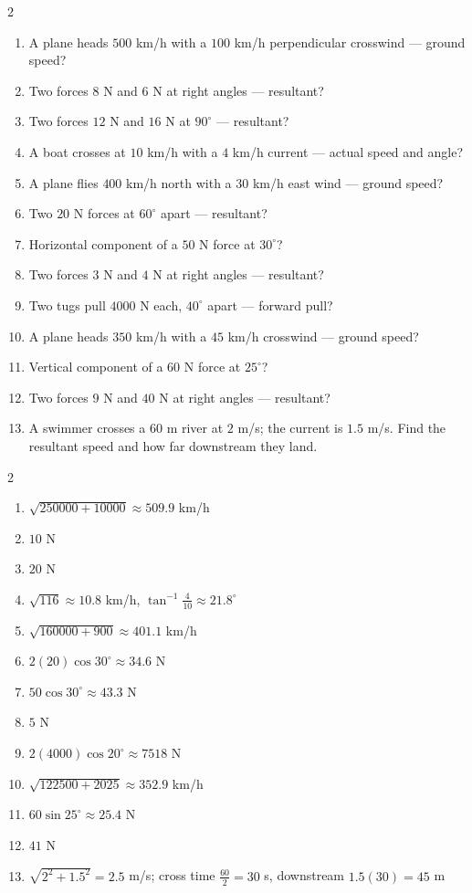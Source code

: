 \documentclass[11pt]{article}
\begin{document}
\begin{recapbox}
\begin{multicols}{2}
\small
\begin{enumerate}[leftmargin=*,itemsep=3pt]
  \item A plane heads $500$ km/h with a $100$ km/h perpendicular crosswind — ground speed?
  \item Two forces $8$ N and $6$ N at right angles — resultant?
  \item Two forces $12$ N and $16$ N at $90^\circ$ — resultant?
  \item A boat crosses at $10$ km/h with a $4$ km/h current — actual speed and angle?
  \item A plane flies $400$ km/h north with a $30$ km/h east wind — ground speed?
  \item Two $20$ N forces at $60^\circ$ apart — resultant?
  \item Horizontal component of a $50$ N force at $30^\circ$?
  \item Two forces $3$ N and $4$ N at right angles — resultant?
  \item Two tugs pull $4000$ N each, $40^\circ$ apart — forward pull?
  \item A plane heads $350$ km/h with a $45$ km/h crosswind — ground speed?
  \item Vertical component of a $60$ N force at $25^\circ$?
  \item Two forces $9$ N and $40$ N at right angles — resultant?
  \item A swimmer crosses a $60$ m river at $2$ m/s; the current is $1.5$ m/s. Find the resultant speed and how far downstream they land.
\end{enumerate}
\end{multicols}
\end{recapbox}

\begin{keybox}
\begin{multicols}{2}
\small
\begin{enumerate}[leftmargin=*,itemsep=3pt]
  \item $\sqrt{250000+10000}\approx509.9$ km/h
  \item $10$ N
  \item $20$ N
  \item $\sqrt{116}\approx10.8$ km/h, $\tan^{-1}\tfrac{4}{10}\approx21.8^\circ$
  \item $\sqrt{160000+900}\approx401.1$ km/h
  \item $2(20)\cos30^\circ\approx34.6$ N
  \item $50\cos30^\circ\approx43.3$ N
  \item $5$ N
  \item $2(4000)\cos20^\circ\approx7518$ N
  \item $\sqrt{122500+2025}\approx352.9$ km/h
  \item $60\sin25^\circ\approx25.4$ N
  \item $41$ N
  \item $\sqrt{2^2+1.5^2}=2.5$ m/s; cross time $\tfrac{60}{2}=30$ s, downstream $1.5(30)=45$ m
\end{enumerate}
\end{multicols}
\end{keybox}
\end{document}
